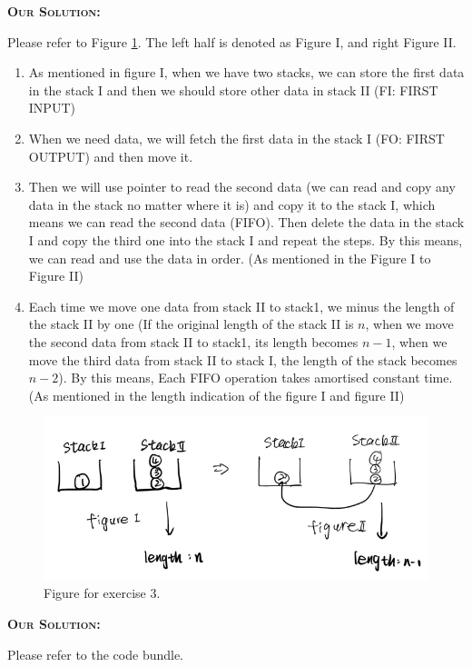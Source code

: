 \documentclass{exam}
\renewenvironment{solution}{\textsc{\textbf{Our Solution:}} \par}{}
\begin{document}
\begin{questions}

	\question
	\begin{solution}
		Please refer to Figure \ref{fig_ex3}. The left half is denoted as Figure I, and right Figure II.
		\begin{enumerate}
			\item As mentioned in figure I, when we have two stacks, we can store the first data in the stack I and then we should store other data in stack II (FI: FIRST INPUT)
			\item When we need data, we will fetch the first data in the stack I (FO: FIRST OUTPUT) and then move it.
			\item Then we will use pointer to read the second data (we can read and copy any data in the stack no matter where it is) and copy it to the stack I, which means we can read the second data (FIFO). Then delete the data in the stack I and copy the third one into the stack I and repeat the steps. By this means, we can read and use the data in order. (As mentioned in the Figure I to Figure II)
			\item Each time we move one data from stack II to stack1, we minus the length of the stack II by one (If the original length of the stack II is $n$, when we move the second data from stack II to stack1, its length becomes $n-1$, when we move the third data from stack II to stack I, the length of the stack becomes $n-2$). By this means, Each FIFO operation takes amortised constant time. (As mentioned in the length indication of the figure I and figure II)
		\end{enumerate}
		\begin{figure}
			\centering
			\includegraphics[width=16cm]{fig_ex3.png}
			\caption{Figure for exercise 3.}
			\label{fig_ex3}
		\end{figure}
	\end{solution}



	\question
	\begin{solution}
		Please refer to the code bundle.
	\end{solution}
\end{questions}
\end{document}
